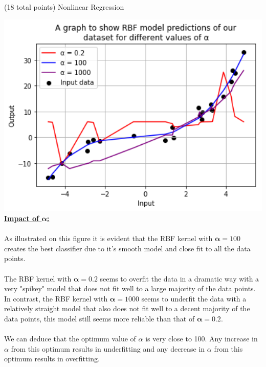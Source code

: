 \documentclass[12pt]{article}
\begin{document}
\begin{question}{(18 total points) Nonlinear Regression}
\begin{subquestion}
\begin{answerbox}{47.5em}
\includegraphics [width=1\textwidth]{images/q2d-graph.png}\\
\large{\textbf{\underline{Impact of $\mathbf{\alpha}$:}}}\\
\\
\normalsize{
As illustrated on this figure it is evident that the RBF kernel with $\mathbf{\alpha} = 100$ creates the best classifier due to it's smooth model and close fit to all the data points.\\
\\
The RBF kernel with $\mathbf{\alpha} = 0.2$ seems to overfit the data in a dramatic way with a very "spikey" model that does not fit well to a large majority of the data points. In contrast, the RBF kernel with $\mathbf{\alpha} = 1000$ seems to underfit the data with a relatively straight model that also does not fit well to a decent majority of the data points, this model still seems more reliable than that of $\mathbf{\alpha} = 0.2$.\\
\\
We can deduce that the optimum value of $\alpha$ is very close to 100. Any increase in $\alpha$ from this optimum results in underfitting and any decrease in $\alpha$ from this optimum results in overfitting. 
}
\end{answerbox}



\end{subquestion}



\end{question}
\end{document}
